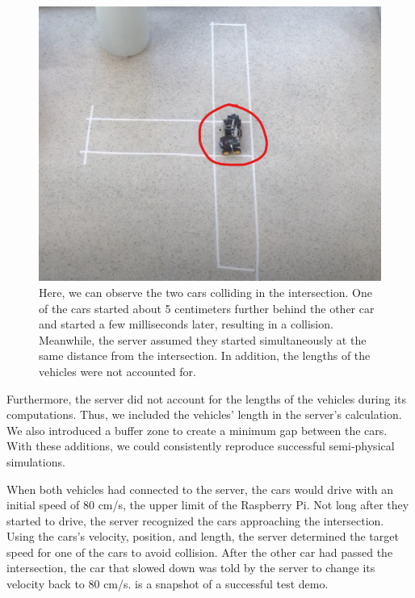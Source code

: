 \begin{figure}[h!]
	\centering
	\includegraphics[width=0.9\linewidth]{figures/demo_crash}
	\caption{Here, we can observe the two cars colliding in the intersection. One of the cars started about 5 centimeters further behind the other car and started a few milliseconds later, resulting in a collision. Meanwhile, the server assumed they started simultaneously at the same distance from the intersection. In addition, the lengths of the vehicles were not accounted for.}
	\label{fig:crashdemo}
\end{figure}

Furthermore, the server did not account for the lengths of the vehicles during its computations. Thus, we included the vehicles' length in the server's calculation. We also introduced a buffer zone to create a minimum gap between the cars. With these additions, we could consistently reproduce successful semi-physical simulations.

When both vehicles had connected to the server, the cars would drive with an initial speed of 80 cm/s, the upper limit of the Raspberry Pi. Not long after they started to drive, the server recognized the cars approaching the intersection. Using the cars's velocity, position, and length, the server determined the target speed for one of the cars to avoid collision. After the other car had passed the intersection, the car that slowed down was told by the server to change its velocity back to 80 cm/s.  is a snapshot of a successful test demo.

